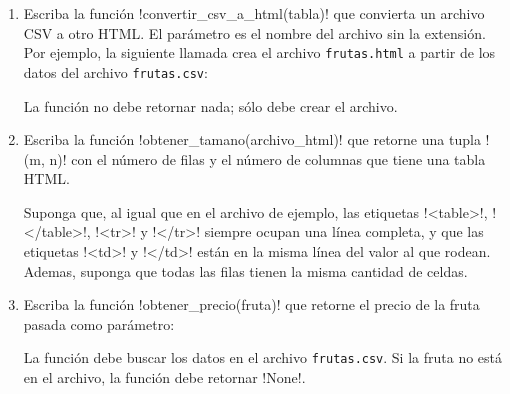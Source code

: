 \begin{enumerate}[leftmargin=0pt,label=\emph{\alph*})]

  \item
    Escriba la función \li!convertir_csv_a_html(tabla)!
    que convierta un archivo CSV a otro HTML\@.
    El parámetro es el nombre del archivo sin la extensión.
    Por ejemplo,
    la siguiente llamada crea el archivo \verb!frutas.html!
    a partir de los datos del archivo \verb!frutas.csv!:
    

    La función no debe retornar nada; sólo debe crear el archivo.

  \item
    Escriba la función \li!obtener_tamano(archivo_html)!
    que retorne una tupla \li!(m, n)!
    con el número de filas y el número de columnas
    que tiene una tabla HTML.
    

    \newcommand\lh{\li[language=html]}

    Suponga que, al igual que en el archivo de ejemplo,
    las etiquetas \lh!<table>!, \lh!</table>!, \lh!<tr>! y \lh!</tr>!
    siempre ocupan una línea completa,
    y que las etiquetas \lh!<td>! y \lh!</td>!
    están en la misma línea del valor al que rodean.
    Ademas,
    suponga que todas las filas tienen
    la misma cantidad de celdas.

  \item
    Escriba la función \li!obtener_precio(fruta)! que
    retorne el precio de la fruta pasada como parámetro:
    

    La función debe buscar los datos en el archivo \verb!frutas.csv!.
    Si la fruta no está en el archivo,
    la función debe retornar \li!None!.

\end{enumerate}
